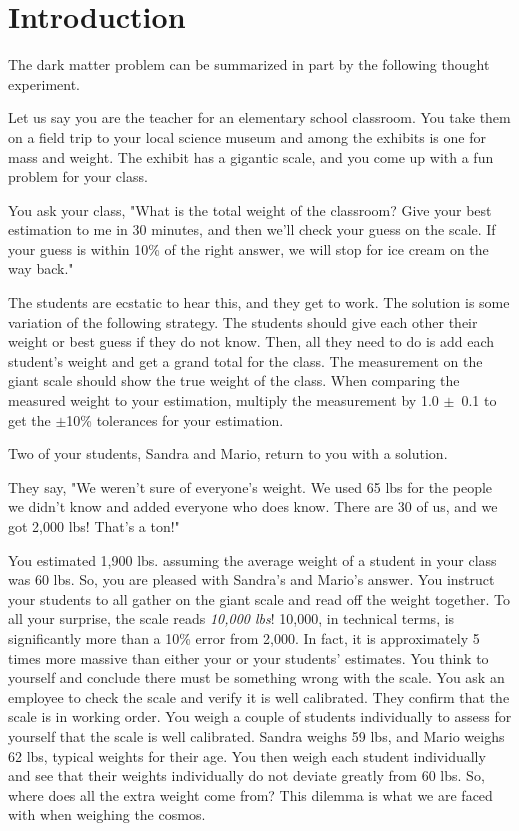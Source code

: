 \section{Introduction\label{sec:intro2dm}}

The dark matter problem can be summarized in part by the following thought experiment.

Let us say you are the teacher for an elementary school classroom.
You take them on a field trip to your local science museum and among the exhibits is one for mass and weight.
The exhibit has a gigantic scale, and you come up with a fun problem for your class.

You ask your class, "What is the total weight of the classroom?
Give your best estimation to me in 30 minutes, and then we'll check your guess on the scale.
If your guess is within 10\% of the right answer, we will stop for ice cream on the way back."

The students are ecstatic to hear this, and they get to work.
The solution is some variation of the following strategy.
The students should give each other their weight or best guess if they do not know.
Then, all they need to do is add each student's weight and get a grand total for the class.
The measurement on the giant scale should show the true weight of the class.
When comparing the measured weight to your estimation, multiply the measurement by 1.0 $\pm$~0.1 to get the $\pm$10\% tolerances for your estimation.

Two of your students, Sandra and Mario, return to you with a solution.

They say, "We weren't sure of everyone's weight.
We used 65 lbs for the people we didn't know and added everyone who does know.
There are 30 of us, and we got 2,000 lbs!
That's a ton!"

You estimated 1,900 lbs. assuming the average weight of a student in your class was 60 lbs.
So, you are pleased with Sandra's and Mario's answer.
You instruct your students to all gather on the giant scale and read off the weight together.
To all your surprise, the scale reads \textit{10,000 lbs}!
10,000, in technical terms, is significantly more than a 10\% error from 2,000.
In fact, it is approximately 5 times more massive than either your or your students' estimates.
You think to yourself and conclude there must be something wrong with the scale.
You ask an employee to check the scale and verify it is well calibrated.
They confirm that the scale is in working order.
You weigh a couple of students individually to assess for yourself that the scale is well calibrated.
Sandra weighs 59 lbs, and Mario weighs 62 lbs, typical weights for their age.
You then weigh each student individually and see that their weights individually do not deviate greatly from 60 lbs.
So, where does all the extra weight come from?
This dilemma is what we are faced with when weighing the cosmos.

